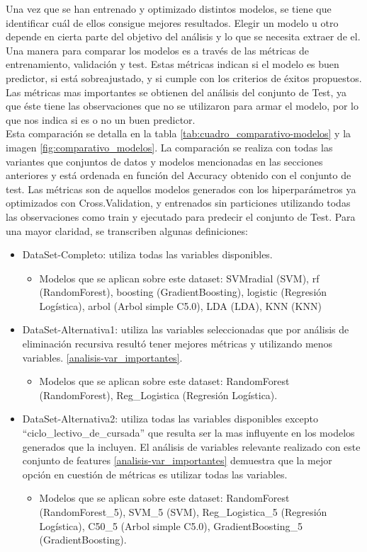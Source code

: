 Una vez que se han entrenado y optimizado distintos modelos, se tiene
que identificar cuál de ellos consigue mejores resultados. Elegir un modelo u otro depende en cierta parte del objetivo del análisis y lo que se necesita extraer de el. Una manera para comparar los modelos es a través de las métricas de entrenamiento, validación y test. Estas métricas indican si el modelo es buen predictor, si está sobreajustado, y si cumple con los criterios de éxitos propuestos.\\

Las métricas mas importantes se obtienen del análisis del conjunto de Test, ya que éste tiene las observaciones que no se utilizaron para armar el modelo, por lo que nos indica si es o no un buen predictor.\\

Esta comparación se detalla en la tabla \ref{tab:cuadro_comparativo-modelos} y la imagen \ref{fig:comparativo_modelos}. La comparación se realiza con todas las variantes que conjuntos de datos y modelos mencionadas en las secciones anteriores y está ordenada en función del Accuracy obtenido con el conjunto de test. Las métricas son de aquellos modelos generados con los hiperparámetros ya optimizados con Cross.Validation, y entrenados sin particiones utilizando todas las observaciones como train y ejecutado para predecir el conjunto de Test. Para una mayor claridad, se transcriben algunas definiciones:

\begin{itemize}
	\item DataSet-Completo: utiliza todas las variables disponibles.
	\begin{itemize}
		\item Modelos que se aplican sobre este dataset: SVMradial (SVM), rf (RandomForest), boosting (GradientBoosting), logistic (Regresión Logística), arbol (Arbol simple C5.0), LDA (LDA), KNN (KNN)  
	\end{itemize}
	\item DataSet-Alternativa1: utiliza las variables seleccionadas que por análisis de eliminación recursiva resultó tener mejores métricas y utilizando menos variables. \ref{analisis-var_importantes}.
		\begin{itemize}
		\item Modelos que se aplican sobre este dataset: RandomForest (RandomForest), Reg\_Logistica (Regresión Logística).
	\end{itemize}
	\item DataSet-Alternativa2: utiliza todas las variables disponibles excepto ``ciclo\_lectivo\_de\_cursada'' que resulta ser la mas influyente en los modelos generados que la incluyen. El análisis de variables relevante realizado con este conjunto de features \ref{analisis-var_importantes} demuestra que la mejor opción en cuestión de métricas es utilizar todas las variables.
			\begin{itemize}
		\item Modelos que se aplican sobre este dataset: RandomForest (RandomForest\_5), SVM\_5 (SVM), Reg\_Logistica\_5 (Regresión Logística), C50\_5 (Arbol simple C5.0), GradientBoosting\_5 (GradientBoosting).
	\end{itemize}
\end{itemize}


